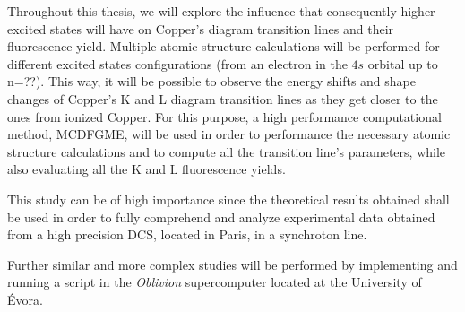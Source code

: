 
%

Throughout this thesis, we will explore the influence that consequently higher excited states will have on Copper's diagram transition lines and their fluorescence yield. Multiple atomic structure calculations will be performed for different excited states configurations (from an electron in the $4s$ orbital up to n=??). This way, it will be possible to observe the energy shifts and shape changes of Copper's K and L diagram transition lines  as they get closer to the ones from ionized Copper. For this purpose, a high performance computational method, \gls{MCDFGME}, will be used in order to performance the necessary atomic structure calculations and to compute all the transition line's parameters, while also evaluating all the K and L fluorescence yields. 

This study can be of high importance since the theoretical results obtained shall be used in order to fully comprehend and analyze experimental data obtained from a high precision \gls{DCS}, located in Paris, in a synchroton line.

Further similar and more complex studies will be performed by implementing and running a script in the \textit{Oblivion} supercomputer located at the University of Évora.

